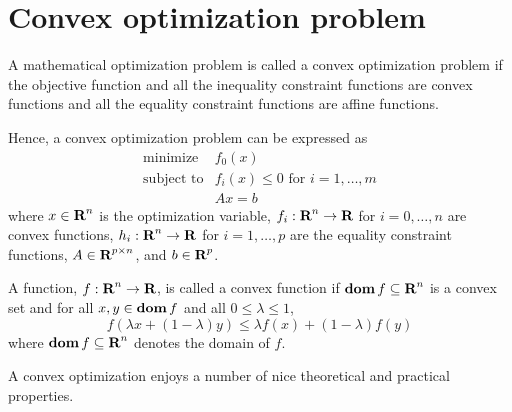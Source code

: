 \documentclass[10pt, twoside]{book}   	%
\begin{document}
\section{Convex optimization problem}

A mathematical optimization problem is called a convex optimization problem
if the objective function and all the inequality constraint functions are convex functions
and all the equality constraint functions are affine functions.

Hence, a convex optimization problem can be expressed as
\begin{equation}
\label{eq:cvx-opt-prob}
\begin{array}{ll}
\mbox{minimize} & f_0(x)
\\
\mbox{subject to} & f_i(x) \leq 0 \mbox{ for } i = 1, \ldots, m
\\
& A x = b
\end{array}
\end{equation}
where
$x\in{\mbox{\bf R}}^n$ is the optimization variable,
$f_i:{\mbox{\bf R}}^n\to{\mbox{\bf R}}$ for $i=0,\ldots,n$ are convex functions,
$h_i:{\mbox{\bf R}}^n\to{\mbox{\bf R}}$ for $i=1,\ldots,p$ are the equality constraint functions,
$A \in {\mbox{\bf R}}^{p\times n}$, and $b\in{\mbox{\bf R}}^p$.

A function, $f:{\mbox{\bf R}}^n \to {\mbox{\bf R}}$, is called a convex function if
$\mathop{\bf dom} f \subseteq {\mbox{\bf R}}^n$ is a convex set
and
for all $x, y\in\mathop{\bf dom} f$
and all $0\leq \lambda \leq 1$,
\begin{equation}
    f( \lambda x + (1-\lambda) y) \leq
    \lambda f(x) + (1-\lambda) f(y)
\end{equation}
where $\mathop{\bf dom} f \subseteq {\mbox{\bf R}}^n$ denotes the domain of $f$.

A convex optimization enjoys a number of nice theoretical and practical properties.
\end{document}
